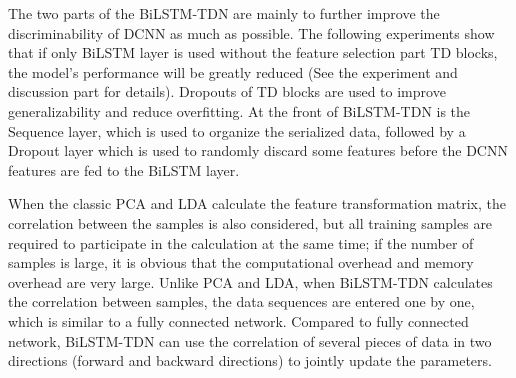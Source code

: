 \documentclass[10pt,twocolumn,letterpaper]{article}
\begin{document}
The two parts of the BiLSTM-TDN are mainly to further improve the discriminability of DCNN as much as possible. The following experiments show that if only BiLSTM layer is used without the feature selection part TD blocks, the model’s performance will be greatly reduced (See the experiment and discussion part for details). Dropouts of TD blocks are used to improve generalizability and reduce overfitting. At the front of BiLSTM-TDN is the Sequence layer, which is used to organize the serialized data, followed by a Dropout layer which is used to randomly discard some features before the DCNN features are fed to the BiLSTM layer.

When the classic PCA and LDA calculate the feature transformation matrix, the correlation between the samples is also considered, but all training samples are required to participate in the calculation at the same time; if the number of samples is large, it is obvious that the computational overhead and memory overhead are very large. Unlike PCA and LDA, when BiLSTM-TDN calculates the correlation between samples, the data sequences are entered one by one, which is similar to a fully connected network. Compared to fully connected network, BiLSTM-TDN can use the correlation of several pieces of data in two directions (forward and backward directions) to jointly update the parameters.
\end{document}
